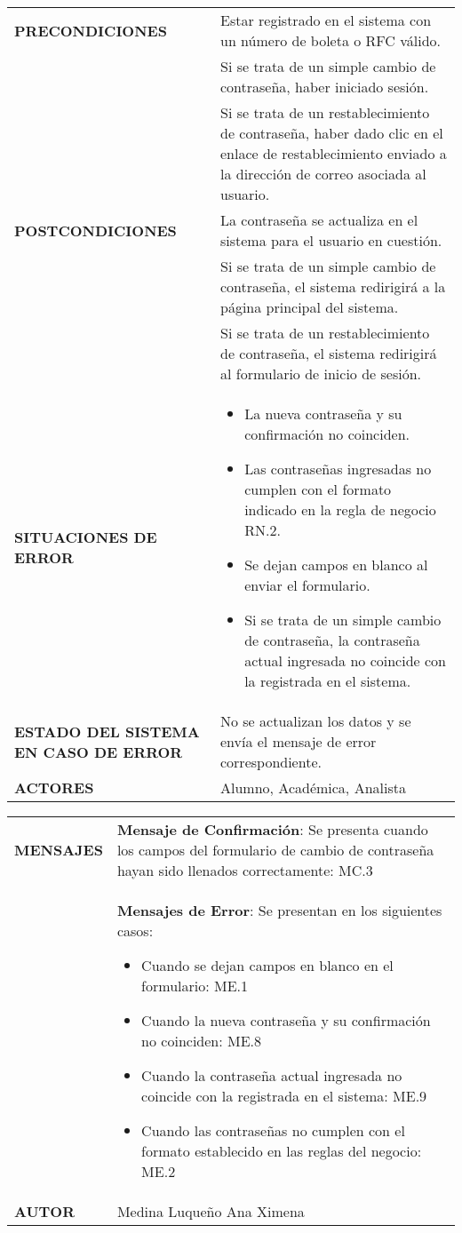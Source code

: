 \begin{longtable}{ | p{6cm} | p{10cm} |}
\hline
\textbf{PRECONDICIONES} & Estar registrado en el sistema con un número de boleta o RFC válido.\\ & Si se trata de un simple cambio de contraseña, haber iniciado sesión.\\ & Si se trata de un restablecimiento de contraseña, haber dado clic en el enlace de restablecimiento enviado a la dirección de correo asociada al usuario.
\\
\hline
\textbf{POSTCONDICIONES} & La contraseña se actualiza en el sistema para el usuario en cuestión.\\ & Si se trata de un simple cambio de contraseña, el sistema redirigirá a la página principal del sistema.\\ & Si se trata de un restablecimiento de contraseña, el sistema redirigirá al formulario de inicio de sesión.\\
\hline
\textbf{SITUACIONES DE ERROR} & \begin{itemize}
    \item La nueva contraseña y su confirmación no coinciden.
    \item Las contraseñas ingresadas no cumplen con el formato indicado en la regla de negocio RN.2.
    \item Se dejan campos en blanco al enviar el formulario.
    \item Si se trata de un simple cambio de contraseña, la contraseña actual ingresada no coincide con la registrada en el sistema.
\end{itemize}\\
\hline
\textbf{ESTADO DEL SISTEMA EN CASO DE ERROR} & No se actualizan los datos y se envía el mensaje de error correspondiente.\\
\hline
\textbf{ACTORES} & Alumno, Académica, Analista\\
\hline
\end{longtable}
\newpage
\begin{longtable}{ | p{6cm} | p{10cm} |}
\hline
\textbf{MENSAJES} & \textbf{Mensaje de Confirmación}: Se presenta cuando los campos del formulario de cambio de contraseña hayan sido llenados correctamente: MC.3 \\ & \textbf{Mensajes de Error}: Se presentan en los siguientes casos: \begin{itemize}
    \item Cuando se dejan campos en blanco en el formulario: ME.1
    \item Cuando la nueva contraseña y su confirmación no coinciden: ME.8
    \item Cuando la contraseña actual ingresada no coincide con la registrada en el sistema: ME.9
    \item Cuando las contraseñas no cumplen con el formato establecido en las reglas del negocio: ME.2
\end{itemize}\\
\hline
\textbf{AUTOR} & Medina Luqueño Ana Ximena\\
\hline
\end{longtable}
